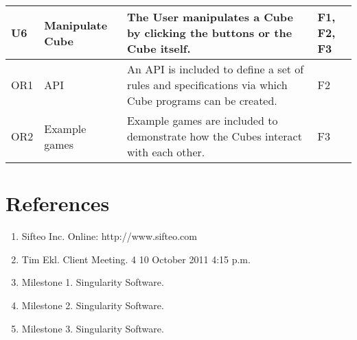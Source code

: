 \documentclass[12pt]{article}
\begin{document}
\begin{landscape}
\begin{table}[h!]
\begin{tabular}{p{.4in} | p{1.75in} | p{6in} | p{.75in}}
        U6 &
        Manipulate Cube &
        The User manipulates a Cube by clicking the buttons or the Cube itself. &
        F1, F2, F3 \\ \hline

        OR1 &
        API &
        An API is included to define a set of rules and specifications via which Cube programs can be created. &
        F2 \\ \hline

        OR2 &
        Example games &
        Example games are included to demonstrate how the Cubes interact with each other. &
        F3 \\ \hline

        \end{tabular}
    \end{table}
    
    
    \end{landscape}

\clearpage
{}
\printglossaries
\clearpage

\section*{References}

        \begin{enumerate}
                \item{Sifteo Inc. Online: http://www.sifteo.com}
                \item{Tim Ekl.  Client Meeting. 4 10 October 2011 4:15 p.m.}
                \item{Milestone 1.  Singularity Software.}
                \item{Milestone 2.  Singularity Software.}
                \item{Milestone 3.  Singularity Software.}
        \end{enumerate}

\clearpage

\printindex
\end{document}
